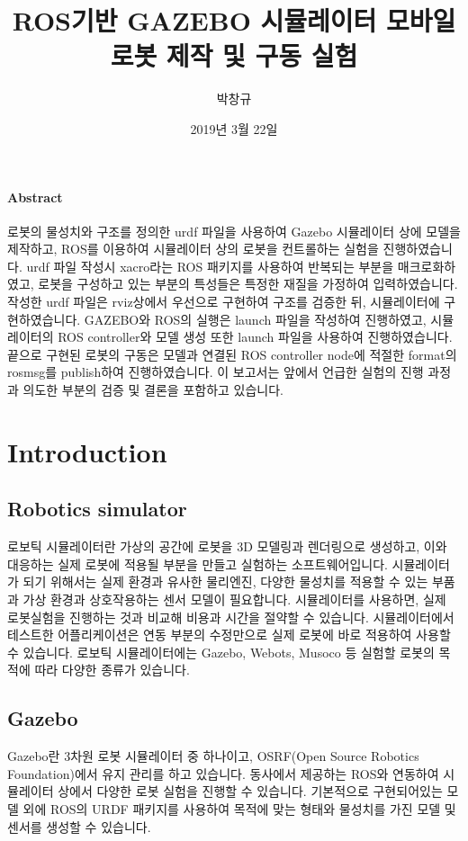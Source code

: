 \documentclass{article}
\title{ROS기반 GAZEBO 시뮬레이터 모바일 로봇 제작 및 구동 실험}
\author{박창규}
\date{2019년 3월 22일}
\begin{document}
	\maketitle
	\thispagestyle{empty}
	\newpage
	\paragraph{Abstract}
	로봇의 물성치와 구조를 정의한 urdf 파일을 사용하여 Gazebo 시뮬레이터 상에 모델을 제작하고, ROS를 이용하여 시뮬레이터 상의 로봇을 컨트롤하는 실험을 진행하였습니다. urdf 파일 작성시 xacro라는 ROS 패키지를 사용하여 반복되는 부분을 매크로화하였고, 로봇을 구성하고 있는 부분의 특성들은 특정한 재질을 가정하여 입력하였습니다. 작성한 urdf 파일은 rviz상에서 우선으로 구현하여 구조를 검증한 뒤, 시뮬레이터에 구현하였습니다. GAZEBO와 ROS의 실행은 launch 파일을 작성하여 진행하였고, 시뮬레이터의 ROS controller와 모델 생성 또한 launch 파일을 사용하여 진행하였습니다. 끝으로 구현된 로봇의 구동은 모델과 연결된 ROS controller node에 적절한 format의 rosmsg를 publish하여 진행하였습니다. 이 보고서는 앞에서 언급한 실험의 진행 과정과 의도한 부분의 검증 및 결론을 포함하고 있습니다.
	\tableofcontents
	\thispagestyle{empty}
	
	\newpage
	\setcounter{page}{1}
		
	\section{Introduction}
		\subsection{Robotics simulator}
		로보틱 시뮬레이터란 가상의 공간에 로봇을 3D 모델링과 렌더링으로 생성하고, 이와 대응하는 실제 로봇에 적용될 부분을 만들고 실험하는 소프트웨어입니다. 시뮬레이터가 되기 위해서는 실제 환경과 유사한 물리엔진, 다양한 물성치를 적용할 수 있는 부품과 가상 환경과 상호작용하는 센서 모델이 필요합니다. 시뮬레이터를 사용하면, 실제 로봇실험을 진행하는 것과 비교해 비용과 시간을 절약할 수 있습니다. 시뮬레이터에서 테스트한 어플리케이션은 연동 부분의 수정만으로 실제 로봇에 바로 적용하여 사용할 수 있습니다. 로보틱 시뮬레이터에는 Gazebo, Webots, Musoco 등 실험할 로봇의 목적에 따라 다양한 종류가 있습니다. 
		
		\subsection{Gazebo}
		Gazebo란 3차원 로봇 시뮬레이터 중 하나이고, OSRF(Open Source Robotics Foundation)에서 유지 관리를 하고 있습니다. 동사에서 제공하는 ROS와 연동하여 시뮬레이터 상에서 다양한 로봇 실험을 진행할 수 있습니다. 기본적으로 구현되어있는 모델 외에 ROS의 URDF 패키지를 사용하여 목적에 맞는 형태와 물성치를 가진 모델 및 센서를 생성할 수 있습니다.
		
\end{document}

